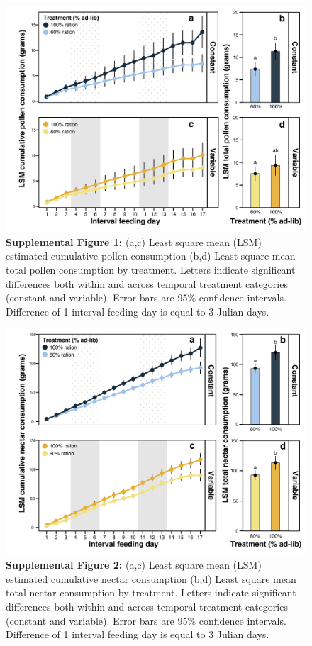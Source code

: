 \documentclass[11pt,]{article}
\title{}
\author{}
\date{}
\begin{document}
\newpage

\begin{figure}
\centering
\includegraphics{./supfig1_pollen.png}
\caption{\textbf{Supplemental Figure 1:} (a,c) Least square mean (LSM)
estimated cumulative pollen consumption (b,d) Least square mean total
pollen consumption by treatment. Letters indicate significant
differences both within and across temporal treatment categories
(constant and variable). Error bars are 95\% confidence intervals.
Difference of 1 interval feeding day is equal to 3 Julian days.}
\end{figure}

\clearpage

\begin{figure}
\centering
\includegraphics{./supfig2_nectar.png}
\caption{\textbf{Supplemental Figure 2:} (a,c) Least square mean (LSM)
estimated cumulative nectar consumption (b,d) Least square mean total
nectar consumption by treatment. Letters indicate significant
differences both within and across temporal treatment categories
(constant and variable). Error bars are 95\% confidence intervals.
Difference of 1 interval feeding day is equal to 3 Julian days.}
\end{figure}
\end{document}
